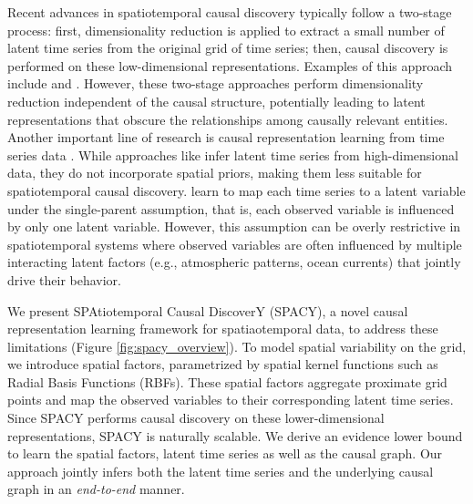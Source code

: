 Recent advances in spatiotemporal causal discovery typically follow a two-stage process: first, dimensionality reduction is applied to extract a small number of latent time series from the original grid of time series; then, causal discovery is performed on these low-dimensional representations. Examples of this approach include \citet{xavi2022teleconnection} and \citet{Falasca_2024}. However, these two-stage approaches perform dimensionality reduction independent of the causal structure, potentially leading to latent representations that obscure the relationships among causally relevant entities. Another important line of research is causal representation learning from time series data \citep{scholkopf2021toward}. While approaches like \citet{yao2021learning, yao2022temporally, chencaring} infer latent time series from high-dimensional data, they do not incorporate spatial priors, making them less suitable for spatiotemporal causal discovery. \citet{brouillard2024causal} learn to map each  time series to a latent variable under the single-parent assumption, that is, each observed variable is influenced by only one latent variable. However, this assumption can be overly restrictive in spatiotemporal systems where observed variables are often influenced by multiple interacting latent factors (e.g., atmospheric patterns, ocean currents) that jointly drive their behavior.

% 

We present SPAtiotemporal Causal DiscoverY (SPACY), a novel causal representation learning framework for spatiaotemporal data, to address these limitations (Figure \ref{fig:spacy_overview}). To model spatial variability on the grid, we introduce spatial factors, parametrized by spatial kernel functions such as Radial Basis Functions (RBFs). These spatial factors aggregate proximate grid points and map the observed variables to their corresponding latent time series. Since SPACY performs causal discovery on these lower-dimensional representations, SPACY is naturally scalable. We derive an evidence lower bound to learn the spatial factors, latent time series as well as the causal graph. Our approach jointly infers both the latent time series and the underlying causal graph in an \textit{end-to-end} manner.


